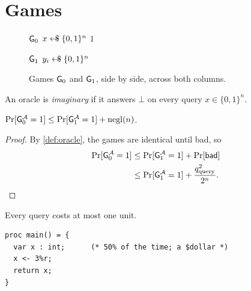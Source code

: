 \section{Games}\label{sec:games}

\begin{figure}[t]
\begin{minipage}{.48\textwidth}
\begin{algorithmic}[1]
\Statex \underline{$\mathsf{G}_{0}$}
\State $x\mathrel{\leftarrow\!\!\mathrel{\$}}\{0,1\}^n$
  \State \Return $1$ 
\EndIf
\end{algorithmic}
\end{minipage}\hfill
\begin{minipage}{.48\textwidth}
\begin{algorithmic}[1]
\Statex \underline{$\mathsf{G}_{1}$}
  \State $y_i\mathrel{\leftarrow\!\!\mathrel{\$}}\{0,1\}^n$
\EndFor
\end{algorithmic}
\end{minipage}
\caption{Games $\mathsf{G}_{0}$ and $\mathsf{G}_{1}$, side by side, across both columns.}\label{fig:games}
\end{figure}

\begin{definition}\label{def:oracle}
An oracle is \emph{imaginary} if it answers $\bot$ on every query $x\in\{0,1\}^n$.
\end{definition}

\begin{lemma}[First]\label{lem:one}
$\Pr[\mathsf{G}_{0}^{\mathcal{A}}=1]\le\Pr[\mathsf{G}_{1}^{\mathcal{A}}=1]+\operatorname{negl}(n)$.
\end{lemma}
\begin{proof}
By \cref{def:oracle}, the games are identical until bad, so
\begin{align}
  \Pr[\mathsf{G}_{0}^{\mathcal{A}}=1] &\le \Pr[\mathsf{G}_{1}^{\mathcal{A}}=1] + \Pr[\mathsf{bad}] \label{eq:hop}\\
  &\le \Pr[\mathsf{G}_{1}^{\mathcal{A}}=1] + \frac{q_{\mathrm{query}}^2}{2^n}. \label{eq:bound}
\end{align}
\end{proof}

\begin{lemma}\label{lem:two}
Every query costs at most one unit.
\end{lemma}

\begin{lstlisting}
proc main() = {
  var x : int;      (* 50% of the time; a $dollar *)
  x <- 3%r;
  return x;
}
\end{lstlisting}
